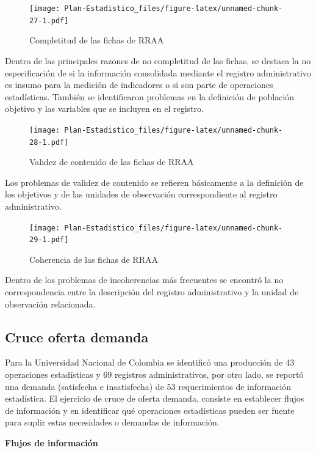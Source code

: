 \documentclass[
]{book}
\begin{document}
\begin{figure}
\centering
\texttt{[image: Plan-Estadistico\_files/figure-latex/unnamed-chunk-27-1.pdf]}
\caption{\label{fig:unnamed-chunk-27}Completitud de las fichas de RRAA}
\end{figure}

Dentro de las principales razones de no completitud de las fichas, se destaca la no especificación
de si la información consolidada mediante el registro administrativo es insumo para la medición de
indicadores o si son parte de operaciones estadísticas. También se identificaron problemas en la
definición de población objetivo y las variables que se incluyen en el registro.

\begin{figure}
\centering
\texttt{[image: Plan-Estadistico\_files/figure-latex/unnamed-chunk-28-1.pdf]}
\caption{\label{fig:unnamed-chunk-28}Validez de contenido de las fichas de RRAA}
\end{figure}

Los problemas de validez de contenido se refieren básicamente a la definición de los objetivos y de
las unidades de observación correspondiente al registro administrativo.

\begin{figure}
\centering
\texttt{[image: Plan-Estadistico\_files/figure-latex/unnamed-chunk-29-1.pdf]}
\caption{\label{fig:unnamed-chunk-29}Coherencia de las fichas de RRAA}
\end{figure}

Dentro de los problemas de incoherencias más frecuentes se encontró la no correspondencia entre
la descripción del registro administrativo y la unidad de observación relacionada.

\hypertarget{cruce-oferta-demanda}{%
\subsection{Cruce oferta demanda}\label{cruce-oferta-demanda}}

Para la Universidad Nacional de Colombia se identificó una producción de 43 operaciones
estadísticas y 69 registros administrativos, por otro lado, se reportó una demanda (satisfecha e
insatisfecha) de 53 requerimientos de información estadística. El ejercicio de cruce de oferta
demanda, consiste en establecer flujos de información y en identificar qué operaciones
estadísticas pueden ser fuente para suplir estas necesidades o demandas de información.

\textbf{Flujos de información}
\end{document}
